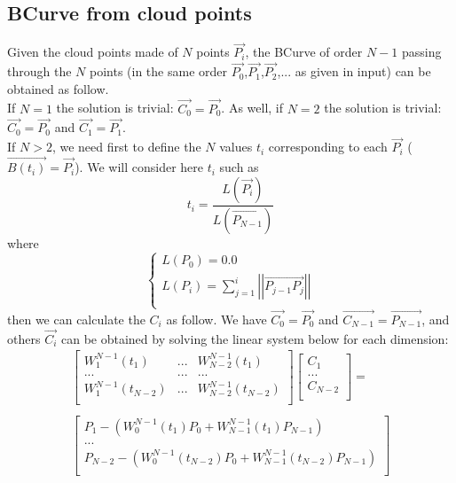\documentclass[12pt, a4paper]{article}
\begin{document}
\subsection{BCurve from cloud points}

Given the cloud points made of $N$ points $\overrightarrow{P_i}$, the BCurve of order $N-1$ passing through the $N$ points (in the same order $\overrightarrow{P_0}$,$\overrightarrow{P_1}$,$\overrightarrow{P_2}$,... as given in input) can be obtained as follow.\\

If $N=1$ the solution is trivial: $\overrightarrow{C_0}=\overrightarrow{P_0}$. As well, if $N=2$ the solution is trivial: $\overrightarrow{C_0}=\overrightarrow{P_0}$ and $\overrightarrow{C_1}=\overrightarrow{P_1}$.\\

If $N>2$, we need first to define the $N$ values $t_i$ corresponding to each $\overrightarrow{P_i}$ ($\overrightarrow{B(t_i)}=\overrightarrow{P_i}$). We will consider here $t_i$ such as\\
\begin{equation}
t_i=\frac{L(\overrightarrow{P_i})}{L(\overrightarrow{P_{N-1}})}
\end{equation}
where
\begin{equation}
\left\lbrace
\begin{array}{l}
L(P_0)=0.0\\
L(P_i)=\sum^i_{j=1}\left|\left|\overrightarrow{P_{j-1}P_j}\right|\right|\\
\end{array}
\right.
\end{equation}
then we can calculate the $C_i$ as follow. We have $\overrightarrow{C_0}=\overrightarrow{P_0}$ and $\overrightarrow{C_{N-1}}=\overrightarrow{P_{N-1}}$, and others $\overrightarrow{C_i}$ can be obtained by solving the linear system below for each dimension:\\
\begin{equation}
\begin{array}{c}
\left[
\begin{array}{ccc}
W^{N-1}_1(t_1)&...&W^{N-1}_{N-2}(t_1)\\
...&...&...\\
W^{N-1}_1(t_{N-2})&...&W^{N-1}_{N-2}(t_{N-2})\\
\end{array}
\right]\left[
\begin{array}{c}
C_1\\
...\\
C_{N-2}\\
\end{array}
\right]=\\
\\
\left[
\begin{array}{c}
P_1-\left(W^{N-1}_0(t_1)P_0+W^{N-1}_{N-1}(t_1)P_{N-1}\right)\\
...\\
P_{N-2}-\left(W^{N-1}_0(t_{N-2})P_0+W^{N-1}_{N-1}(t_{N-2})P_{N-1}\right)\\
\end{array}
\right]
\end{array}
\end{equation}
\end{document}
